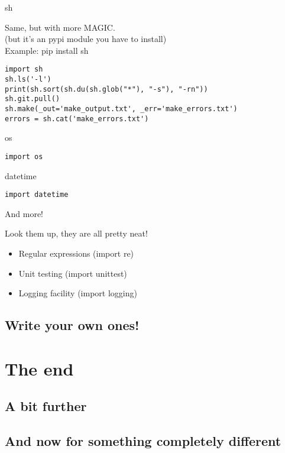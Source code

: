 \documentclass[ignorenonframetext,]{beamer}
\begin{document}
\begin{frame}[fragile]{sh}

    Same, but with more MAGIC.\\
    (but it's an pypi module you have to install)\\
    Example: pip install sh

    \begin{tcolorbox}
    \begin{verbatim}
import sh
sh.ls('-l')
print(sh.sort(sh.du(sh.glob("*"), "-s"), "-rn"))
sh.git.pull()
sh.make(_out='make_output.txt', _err='make_errors.txt')
errors = sh.cat('make_errors.txt')
    \end{verbatim}
    \end{tcolorbox}
\end{frame}

\begin{frame}[fragile]{os}
    \begin{tcolorbox}
    \begin{verbatim}
import os
    \end{verbatim}
    \end{tcolorbox}
\end{frame}

\begin{frame}[fragile]{datetime}
    \begin{tcolorbox}
    \begin{verbatim}
import datetime
    \end{verbatim}
    \end{tcolorbox}
\end{frame}

\begin{frame}[fragile]{And more!}

    Look them up, they are all pretty neat!

    \begin{itemize}
        \item Regular expressions (import re)
        \item Unit testing (import unittest)
        \item Logging facility (import logging)
    \end{itemize}
\end{frame}

\subsection{Write your own ones!}

\section{The end}
\subsection{A bit further}
\subsection{And now for something completely different}
\end{document}
